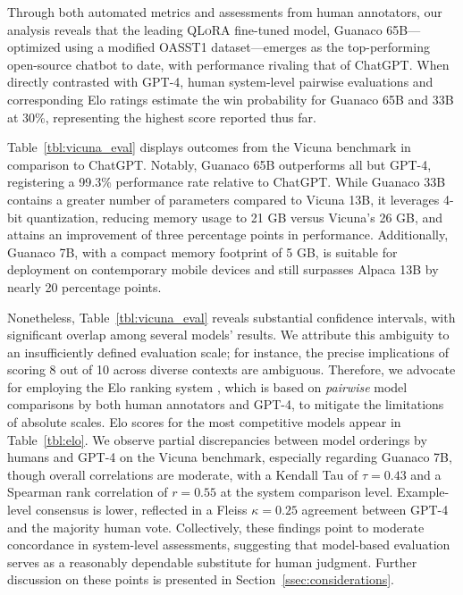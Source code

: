Through both automated metrics and assessments from human annotators, our analysis reveals that the leading \textsc{QLoRA} fine-tuned model, {Guanaco} 65B—optimized using a modified OASST1 dataset—emerges as the top-performing open-source chatbot to date, with performance rivaling that of ChatGPT. When directly contrasted with GPT-4, human system-level pairwise evaluations and corresponding Elo ratings estimate the win probability for {Guanaco} 65B and 33B at 30\%, representing the highest score reported thus far.

Table~\ref{tbl:vicuna_eval} displays outcomes from the Vicuna benchmark \cite{vicuna2023} in comparison to ChatGPT. Notably, {Guanaco} 65B outperforms all but GPT-4, registering a 99.3\% performance rate relative to ChatGPT. While {Guanaco} 33B contains a greater number of parameters compared to Vicuna 13B, it leverages 4-bit quantization, reducing memory usage to 21 GB versus Vicuna’s 26 GB, and attains an improvement of three percentage points in performance. Additionally, {Guanaco} 7B, with a compact memory footprint of 5 GB, is suitable for deployment on contemporary mobile devices and still surpasses Alpaca 13B by nearly 20 percentage points.

Nonetheless, Table~\ref{tbl:vicuna_eval} reveals substantial confidence intervals, with significant overlap among several models’ results. We attribute this ambiguity to an insufficiently defined evaluation scale; for instance, the precise implications of scoring 8 out of 10 across diverse contexts are ambiguous. Therefore, we advocate for employing the Elo ranking system \citep{elo1967proposed}, which is based on \textit{pairwise} model comparisons by both human annotators and GPT-4, to mitigate the limitations of absolute scales. Elo scores for the most competitive models appear in Table~\ref{tbl:elo}. We observe partial discrepancies between model orderings by humans and GPT-4 on the Vicuna benchmark, especially regarding Guanaco 7B, though overall correlations are moderate, with a Kendall Tau of $\tau=0.43$ and a Spearman rank correlation of $r=0.55$ at the system comparison level. Example-level consensus is lower, reflected in a Fleiss $\kappa=0.25$ agreement between GPT-4 and the majority human vote. Collectively, these findings point to moderate concordance in system-level assessments, suggesting that model-based evaluation serves as a reasonably dependable substitute for human judgment. Further discussion on these points is presented in Section~\ref{ssec:considerations}.

